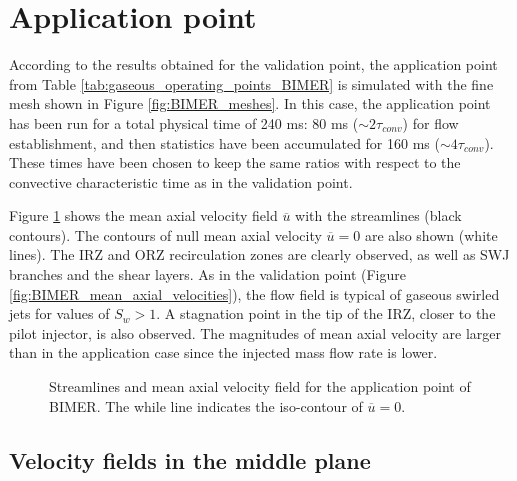 \clearpage

\section{Application point}
	\label{ch7:BIMER_application_point}
	
According to the results obtained for the validation point, the application point from Table \ref{tab:gaseous_operating_points_BIMER} is simulated with the fine mesh shown in Figure \ref{fig:BIMER_meshes}. In this case, the application point has been run for a total physical time of 240 ms: 80 ms ($\sim 2 \tau_{conv}$) for flow establishment, and then statistics have been accumulated for 160 ms ($\sim 4 \tau_{conv}$). These times have been chosen to keep the same ratios with respect to the convective characteristic time as in the validation point.
	
Figure \ref{fig:BIMER_application_streamlines} shows the mean axial velocity field $\overline{u}$ with the streamlines (black contours). The contours of null mean axial velocity $\overline{u} = 0$ are also shown (white lines). The IRZ and ORZ recirculation zones are clearly observed, as well as SWJ branches and the shear layers. As in the validation point (Figure \ref{fig:BIMER_mean_axial_velocities}), the flow field is typical of gaseous swirled jets for values of $S_w > 1$. A stagnation point in the tip of the IRZ, closer to the pilot injector, is also observed. The magnitudes of mean axial velocity are larger than in the application case since the injected mass flow rate is lower.

\begin{figure}[ht]
\centering
{}
\caption[Streamlines and mean axial velocity field for the application point of BIMER]{Streamlines and mean axial velocity field for the application point of BIMER. The while line indicates the iso-contour of $\overline{u} = 0$.}
\label{fig:BIMER_application_streamlines}
\end{figure}

\subsection{Velocity fields in the middle plane}

